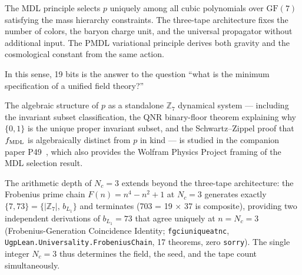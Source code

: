 \documentclass[11pt]{article}
\theoremstyle{remark}
\newcommand{\lean}[1]{%
  \penalty-100
  \begingroup\def\_{\textunderscore\allowbreak}\texttt{#1}\endgroup}
\newcommand{\GFseven}{\mathrm{GF}(7)}
\begin{document}
The MDL principle selects $p$ uniquely among all cubic polynomials over $\GFseven$
satisfying the mass hierarchy constraints. The three-tape architecture fixes
the number of colors, the baryon charge unit, and the universal propagator without
additional input. The PMDL variational principle derives both gravity and the
cosmological constant from the same action.

In this sense, 19 bits is the answer to the question ``what is the minimum
specification of a unified field theory?''

The algebraic structure of $p$ as a standalone $\mathbb{Z}_7$ dynamical system ---
including the invariant subset classification, the QNR binary-floor theorem explaining
why $\{0,1\}$ is the unique proper invariant subset, and the Schwartz--Zippel
proof that $f_{\rm MDL}$ is algebraically distinct from $p$ in kind --- is studied
in the companion paper P49~\cite{SpivackGTEPolynomialWolfram}, which also provides
the Wolfram Physics Project framing of the MDL selection result.

The arithmetic depth of $N_c = 3$ extends beyond the three-tape architecture: the Frobenius prime chain $F(n) = n^4 - n^2 + 1$ at $N_c = 3$ generates exactly $\{7, 73\} = \{|\mathbb{Z}_7|,\, b_{L_1}\}$ and terminates (703 = 19 × 37 is composite), providing two independent derivations of $b_{L_1} = 73$ that agree uniquely at $n = N_c = 3$ (Frobenius-Generation Coincidence Identity; \lean{fgci\_unique\_at\_nc}, \texttt{UgpLean.Universality.FrobeniusChain}, 17 theorems, zero \texttt{sorry}). The single integer $N_c = 3$ thus determines the field, the seed, and the tape count simultaneously.
\end{document}
